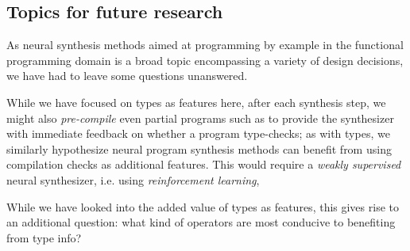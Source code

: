 \documentclass{article} %
\begin{document}
\subsection{Topics for future research}

As neural synthesis methods aimed at programming by example in the functional
programming domain is a broad topic encompassing a variety of design decisions,
we have had to leave some questions unanswered.


    While we have focused on types as features here,
    after each synthesis step,
    we might also \emph{pre-compile} even partial programs such as to provide the synthesizer with immediate feedback on whether a program type-checks;
    as with types, we similarly hypothesize neural program synthesis methods can benefit from using compilation checks as additional features.
    This would require a \emph{weakly supervised} neural synthesizer,
    i.e. using \emph{reinforcement learning},

    While we have looked into the added value of types as features,
    this gives rise to an additional question:
    what kind of operators are most conducive to benefiting from type info?

\end{document}
